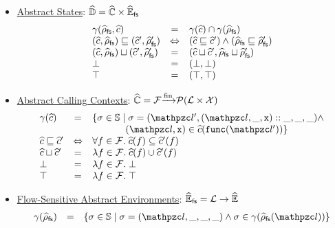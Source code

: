 \begin{itemize}
  \item \underline{Abstract States}:
    $\widehat{\mathbb{D}} = \widehat{\mathbb{C}} \times \widehat{\mathbb{E}}_{\textsf{fs}}$
    \[
      \begin{array}{lcl}
        \gamma(\widehat{\rho}_{\textsf{fs}}, \widehat{c}) &=& \gamma(\widehat{c}) \cap
        \gamma(\widehat{\rho}_{\textsf{fs}})\\

        (\widehat{c}, \widehat{\rho}_{\textsf{fs}}) \sqsubseteq (\widehat{c}', \widehat{\rho}_{\textsf{fs}}') &\Leftrightarrow&
        (\widehat{c} \sqsubseteq \widehat{c}') \wedge (\widehat{\rho}_{\textsf{fs}} \sqsubseteq \widehat{\rho}_{\textsf{fs}}')\\

        (\widehat{c}, \widehat{\rho}_{\textsf{fs}}) \sqcup (\widehat{c}', \widehat{\rho}_{\textsf{fs}}') &=&
        (\widehat{c} \sqcup \widehat{c}', \widehat{\rho}_{\textsf{fs}} \sqcup \widehat{\rho}_{\textsf{fs}}')\\

        \bot &=& (\bot, \bot)\\

        \top &=& (\top, \top)\\
      \end{array}
    \]

  \item \todo \underline{Abstract Calling Contexts}:
    $\widehat{\mathbb{C}} = \mathcal{F} {\xrightarrow[]{\text{fin}}} \mathcal{P}(\mathcal{L} \times \mathcal{X})$
    \[
      \begin{array}{lcl}
        \gamma(\actxt) &=& \{ \st \in \stset \mid
          \st = (\lab', (\lab, \_, \varx) :: \_, \_, \_) \wedge \\&&
          \phantom{\{ \st \in \stset \mid} (\lab, \varx) \in
            \actxt(\getfunc(\lab'))
        \}\\

        \actxt \order \actxt' &\Leftrightarrow&
        \forall \func \in \funcset. \; \actxt(\func) \subseteq \actxt'(\func)\\

        \actxt \join \actxt' &=&
        \lambda \func \in \funcset. \; \actxt(\func) \cup \actxt'(\func)\\

        \bot &=& \lambda \func \in \funcset. \; \bot\\

        \top &=& \lambda \func \in \funcset. \; \top\\
      \end{array}
    \]

  \item \underline{Flow-Sensitive Abstract Environments}:
    $\widehat{\mathbb{E}}_{\textsf{fs}} = \mathcal{L} \rightarrow \widehat{\mathbb{E}}$
    \[
      \begin{array}{lcl}
        \gamma(\afsenv) &=& \{ \st \in \stset \mid
          \st = (\lab, \_, \_, \_) \wedge \st \in \gamma(\afsenv(\lab))
        \}\\


\end{array}\]
\end{itemize}
